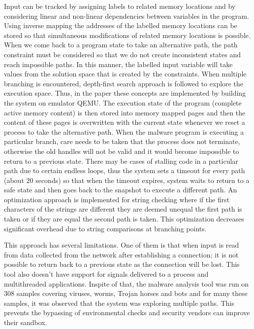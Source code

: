 \documentclass[11pt]{article}
\begin{document}
		Input can be tracked by assigning labels to related memory locations and by considering linear and non-linear dependencies between variables in the program. Using inverse mapping the addresses of the labelled memory locations can be stored so that simultaneous modifications of related memory locations is possible. When we come back to a program state to take an alternative path, the path constraint must be considered so that we do not create inconsistent states and reach impossible paths. In this manner, the labelled input variable will take values from the solution space that is created by the constraints. When multiple branching is encountered, depth-first search approach is followed to explore the execution space. Thus, in the paper these concepts are implemented by building the system on emulator QEMU. The execution state of the program (complete active memory content) is then stored into memory mapped pages and then the content of these pages is overwritten with the current state whenever we reset a process to take the alternative path. When the malware program is executing a particular branch, care needs to be taken that the process does not terminate, otherwise the old handles will not be valid and it would become impossible to return to a previous state. There may be cases of stalling code in a particular path due to certain endless loops, thus the system sets a timeout for every path (about 20 seconds) so that when the timeout expires, system waits to return to a safe state and then goes back to the snapshot to execute a different path. An optimization approach is implemented for string checking where if the first characters of the strings are different they are deemed unequal the first path is taken or if they are equal the second path is taken.  This optimization decreases significant overhead due to string comparisons at branching points.  

		This approach has several limitations. One of them is that when input is read from data collected from the network after establishing a connection; it is not possible to return back to a previous state as the connection will be lost. This tool also doesn’t have support for signals delivered to a process and multithreaded applications. Inspite of that, the malware analysis tool was run on 308 samples covering viruses, worms, Trojan horses and bots and for many these samples, it was observed that the system was exploring multiple paths. This prevents the bypassing of environmental checks and security vendors can improve their sandbox.
		
\end{document}
